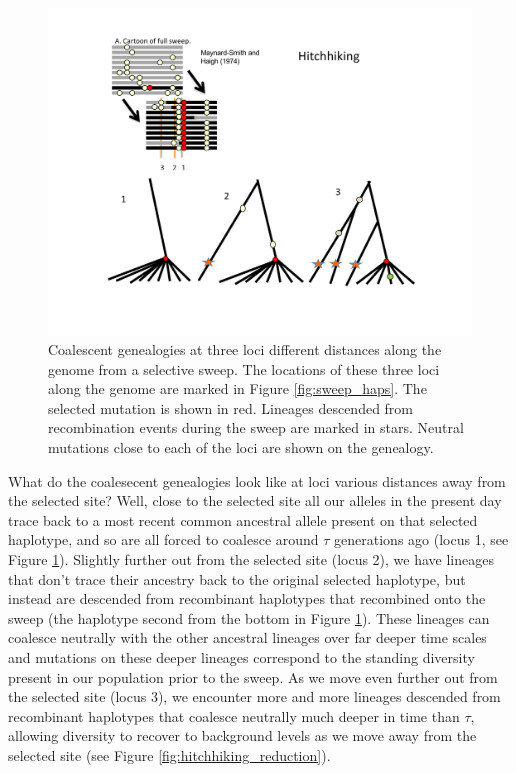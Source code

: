 \begin{figure}
\begin{center}
\includegraphics[width= 0.9 \textwidth]{figures/Hitchhiking/recom_haps_coal_sweep.pdf}
\end{center}
\caption{Coalescent genealogies at three loci different distances along the genome from a selective sweep. The locations of these three loci along the genome are marked in Figure \ref{fig:sweep_haps}. The selected mutation is shown in red. Lineages descended from recombination events during the sweep are marked in stars. Neutral mutations close to each of the loci are shown on the genealogy.} \label{fig:sweep_haps_coal}
\end{figure}

What do the coalesecent genealogies look like at loci various distances away from the
selected site? Well, close to the selected site all our alleles in the
present day trace back to a most recent common ancestral allele
present on that selected haplotype, and so are all forced to coalesce
around $\tau$ generations ago (locus 1, see Figure \ref{fig:sweep_haps_coal}). Slightly further out from the selected
site (locus 2), we have lineages that don't trace their ancestry back
to the original selected haplotype, but instead are descended from
recombinant haplotypes that recombined onto the sweep (the haplotype second from the
bottom in Figure \ref{fig:sweep_haps_coal}). These lineages can coalesce neutrally with the other ancestral lineages
over far deeper time scales and mutations on these deeper lineages
correspond to the standing diversity present in our population
prior to the sweep. As we move even further out from the selected site
(locus 3), we encounter more and more lineages descended from
recombinant haplotypes that coalesce neutrally much deeper in time than $\tau$, 
allowing diversity to recover to background levels as we move away
from the selected site (see Figure \ref{fig:hitchhiking_reduction}).

